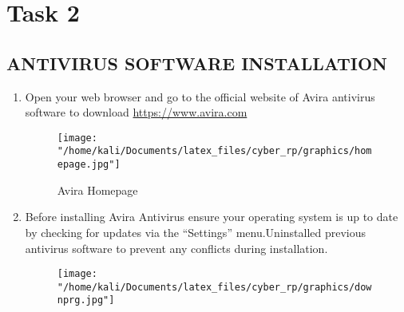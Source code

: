 \chapter*{\centering Task 2}
\section*{ANTIVIRUS SOFTWARE INSTALLATION}
\begin{enumerate}
	\item
	Open your web browser and go to the official website of Avira antivirus software to download \url{https://www.avira.com}
	\begin{figure}[H]
		\centering
			\texttt{[image: "/home/kali/Documents/latex\_files/cyber\_rp/graphics/homepage.jpg"]} \\
		\caption{Avira Homepage}
	\end{figure}
	\item
	Before installing Avira Antivirus ensure your operating system  is up to date by checking for updates via the “Settings” menu.Uninstalled  previous antivirus software to prevent any conflicts during installation.
	\begin{figure}
		\centering
		\texttt{[image: "/home/kali/Documents/latex\_files/cyber\_rp/graphics/downprg.jpg"]} \\


\end{figure}
\end{enumerate}
